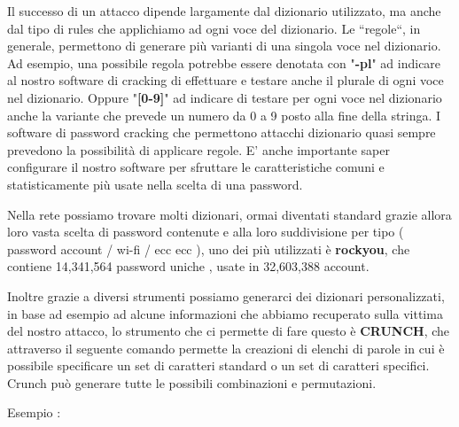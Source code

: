 Il successo di un attacco dipende largamente dal dizionario utilizzato, ma anche dal tipo di rules che applichiamo ad ogni voce del dizionario. Le “regole“, in generale, permettono di generare più varianti di una singola voce nel dizionario. Ad esempio, una possibile regola potrebbe essere denotata con "\textbf{-pl}" ad indicare al nostro software di cracking di effettuare e testare anche il plurale di ogni voce nel dizionario. Oppure "\textbf{[0-9]}" ad indicare di testare per ogni voce nel dizionario anche la variante che prevede un numero da 0 a 9 posto alla fine della stringa. I software di password cracking che permettono attacchi dizionario quasi sempre prevedono la possibilità di applicare regole. E’ anche importante saper configurare il nostro software per sfruttare le caratteristiche comuni e statisticamente più usate nella scelta di una password.

Nella rete possiamo trovare molti dizionari, ormai diventati standard grazie allora loro vasta scelta di password contenute e alla loro suddivisione per tipo ( password account / wi-fi / ecc ecc ), uno dei più utilizzati è \textbf{rockyou}, che contiene 14,341,564 password uniche , usate in 32,603,388 account.

Inoltre grazie a diversi strumenti possiamo generarci dei dizionari personalizzati, in base ad esempio ad alcune informazioni che abbiamo recuperato sulla vittima del nostro attacco, lo strumento che ci permette di fare questo è \textbf{CRUNCH}\cite{CRUNCH}, che attraverso il seguente comando permette la creazioni di elenchi di parole in cui è possibile specificare un set di caratteri standard o un set di caratteri specifici. Crunch può generare tutte le possibili combinazioni e permutazioni. 

Esempio :

